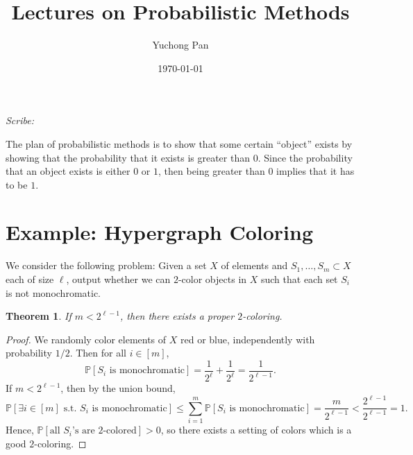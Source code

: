 \documentclass[letterpaper, reqno,11pt]{article}
\newcommand{\PP}{\mathbb{P}}
\begin{document}
\title{Lectures on Probabilistic Methods}
\author{Yuchong Pan}
\date{\today}
\newtheorem{theorem}{Theorem}
\newtheorem{lemma}[theorem]{Lemma}
\newtheorem{proposition}[theorem]{Proposition}
\newtheorem{corollary}[theorem]{Corollary}
\newtheorem{fact}[theorem]{Fact}
\newtheorem{claim}{Claim}
\newtheorem{exercise}{Exercise}
\theoremstyle{definition}
\newtheorem{definition}[theorem]{Definition}
%

\begin{framed}
 \hfill \thedate
\begin{center}
\Large{\thetitle}
\end{center}
 \hfill {\em Scribe: \theauthor}
\end{framed}

The plan of probabilistic methods is to show that some certain ``object'' exists by showing that the probability that it exists is greater than $0$. Since the probability that an object exists is either $0$ or $1$, then being greater than $0$ implies that it has to be $1$.

\section{Example: Hypergraph Coloring}

We consider the following problem: Given a set $X$ of elements and $S_1, \ldots, S_m \subset X$ each of size $\ell$, output whether we can $2$-color objects in $X$ such that each set $S_i$ is not monochromatic.

\begin{theorem}
  If $m < 2^{\ell - 1}$, then there exists a proper $2$-coloring.
\end{theorem}

\begin{proof}
  We randomly color elements of $X$ red or blue, independently with probability $1/2$. Then for all $i \in [m]$,
  $$ \PP\left[\text{$S_i$ is monochromatic}\right] = \frac{1}{2^\ell} + \frac{1}{2^\ell} = \frac{1}{2^{\ell - 1}}. $$
  If $m < 2^{\ell - 1}$, then by the union bound,
  $$ \PP\left[\exists i \in [m] \text{ s.t.\ $S_i$ is monochromatic}\right] \leq \sum_{i = 1}^m \PP\left[\text{$S_i$ is monochromatic}\right] = \frac{m}{2^{\ell - 1}} < \frac{2^{\ell - 1}}{2^{\ell - 1}} = 1. $$
  Hence, $\PP[\text{all $S_i$'s are $2$-colored}] > 0$, so there exists a setting of colors which is a good $2$-coloring.
\end{proof}
\end{document}
